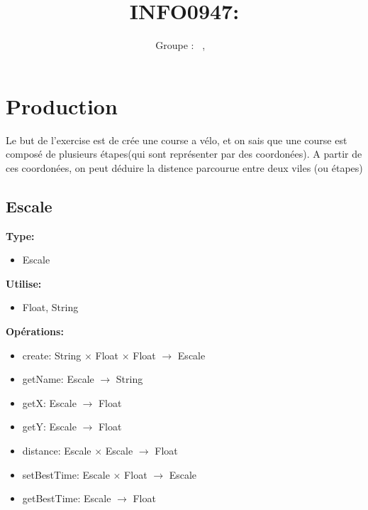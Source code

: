 \documentclass[a4paper, 11pt, oneside]{article}
\title{INFO0947: \intitule}
\author{Groupe \GrNbr : \PrenomUN~\textsc{\NomUN}, \PrenomDEUX~\textsc{\NomDEUX}}
\date{}
\begin{document}
\maketitle


\section{Production}


Le but de l'exercise  est de crée une course a vélo, et on sais que
une course est composé de plusieurs étapes(qui sont représenter par des coordonées).
A partir de ces coordonées, on peut déduire la distence parcourue entre deux viles (ou étapes)

\subsection{Escale}

\textbf{Type:}
\begin{itemize}
    \item[] Escale
\end{itemize}

\textbf{Utilise:}
\begin{itemize}
    \item[] Float, String
\end{itemize}

\textbf{Opérations:}
\begin{itemize}
    \item[] create: String $\times$ Float $\times$ Float $\to$ Escale
    \item[] getName: Escale $\to$ String
    \item[] getX: Escale $\to$ Float
    \item[] getY: Escale $\to$ Float
    \item[] distance: Escale $\times$ Escale $\to$ Float
    \item[] setBestTime: Escale $\times$ Float $\to$ Escale
    \item[] getBestTime: Escale $\to$ Float
\end{itemize}
\end{document}
